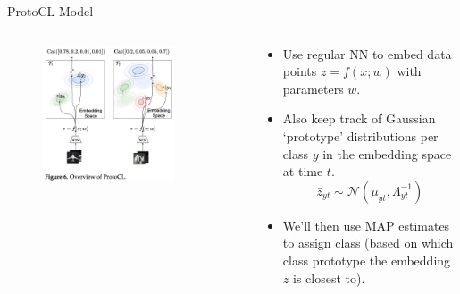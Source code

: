 \documentclass[12pt,aspectratio=169, handout]{beamer}
\let\olditem\item
\renewcommand\item{\olditem\justifying}
\begin{document}
\begin{frame}{ProtoCL Model}
\begin{columns}
    \begin{column}{0.4\textwidth}
        \begin{figure}
		\centering
		\includegraphics[width=0.8\textwidth]{"images/Fig6_full.png"}
	\end{figure}
    \end{column} 
    \begin{column}{0.6\textwidth}
        \begin{itemize}[<+->]
            \item Use regular NN to embed data points $z = f(x; w)$ with parameters $w$.
            \item Also keep track of Gaussian `prototype' distributions per class $y$ in the embedding space at time $t$.
            $$\bar{z}_{yt} \sim \mathcal{N}(\mu_{yt}, \Lambda_{yt}^{-1})$$
            
            \item We'll then use MAP estimates to assign class (based on which class prototype the embedding $z$ is closest to).
        \end{itemize}
    \end{column}
\end{columns}
\end{frame}
\end{document}

